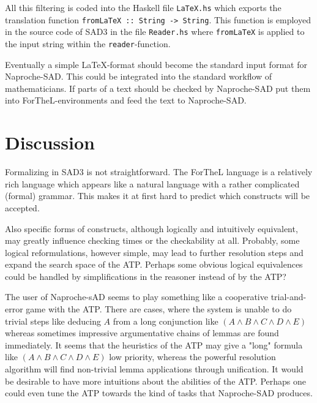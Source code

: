 \documentclass{article}
\begin{document}
All this filtering is coded into the Haskell file
{\tt LaTeX.hs} which exports the translation function
{\tt fromLaTeX :: String -> String}.
This function is employed in the source code of SAD3 in the file
{\tt Reader.hs} where {\tt fromLaTeX} is applied to the input string within the {\tt reader}-function.

Eventually a simple {\LaTeX}-format should become the standard input format for Naproche-SAD. This could be integrated into the standard workflow of mathematicians. If parts of a text should be checked by Naproche-SAD put them into ForTheL-environments and feed the text 
to Naproche-SAD.


\section{Discussion}

Formalizing in SAD3 is not straightforward. The ForTheL language is a relatively rich language which appears like a natural language with a rather complicated (formal) grammar. This makes it at first hard to predict which constructs will be accepted.

Also specific forms of constructs, although logically and intuitively equivalent, may greatly influence checking times or the checkability at all. Probably, some logical reformulations, however simple, may lead to further resolution steps and expand the search space of the ATP. Perhaps some obvious logical equivalences could be handled by simplifications in the reasoner instead of by the ATP?

The user of Naproche-sAD seems to play something like a cooperative trial-and-error game with the ATP. There are cases, where the system is unable to do trivial steps like deducing $A$ from a long conjunction like $(A\wedge B\wedge C\wedge D \wedge E)$ whereas sometimes impressive argumentative chains of lemmas are found immediately. It seems that the heuristics of the ATP may give a "long" formula like $(A\wedge B\wedge C\wedge D \wedge E)$ low priority, whereas the powerful resolution algorithm will find non-trivial lemma applications through unification. It would be desirable to have more intuitions about the abilities of the ATP. Perhaps one could even tune the ATP towards the kind of tasks that Naproche-SAD produces.  
  
\end{document}
